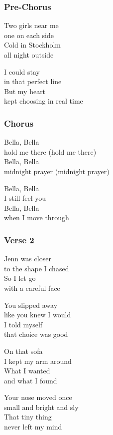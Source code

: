 \subsubsection{Pre-Chorus}\label{pre-chorus-33}

Two girls near me\\
one on each side\\
Cold in Stockholm\\
all night outside

I could stay\\
in that perfect line\\
But my heart\\
kept choosing in real time

\subsubsection{Chorus}\label{chorus-53}

Bella, Bella\\
hold me there (hold me there)\\
Bella, Bella\\
midnight prayer (midnight prayer)

Bella, Bella\\
I still feel you\\
Bella, Bella\\
when I move through

\subsubsection{Verse 2}\label{verse-2-21}

Jenn was closer\\
to the shape I chased\\
So I let go\\
with a careful face

You slipped away\\
like you knew I would\\
I told myself\\
that choice was good

On that sofa\\
I kept my arm around\\
What I wanted\\
and what I found

Your nose moved once\\
small and bright and sly\\
That tiny thing\\
never left my mind

